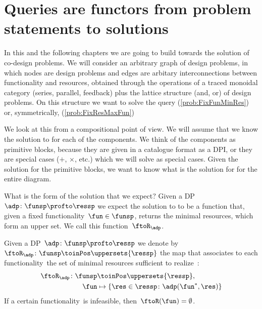 \section{Queries are functors from problem statements to solutions}

\publictodomessage

In this and the following chapters we are going to build towards the solution of co-design problems.
We will consider an arbitrary graph of design problems, in which nodes are design problems and edges are arbitary interconnections between functionality and resources, obtained through the operations of a traced monoidal category (series, parallel, feedback) plus the lattice structure (and, or) of design problems. On this structure we want to solve the query \FixFunMinRes (\cref{prob:FixFunMinRes}) or, symmetrically, \FixResMaxFun (\cref{prob:FixResMaxFun})


We look at this from a compositional point of view.
We will assume that we know the solution to \FixFunMinRes for each of the components.
We think of the components as primitive blocks, because they are given in a catalogue format as a DPI, or they are special cases ($+$, $\times$, etc.) which we will solve as special cases.
Given the solution for the primitive blocks, we want to know what is the solution for \FixFunMinRes for the entire diagram.

What is the form of the solution that we expect?
Given a DP~$\adp\colon \funsp \profto \ressp$ we expect the solution to \FixFunMinRes to be a function that, given a fixed functionality~$\fun\in\funsp$, returns the minimal resources, which form an upper set.
We call this function~$\ftoR_\adp$.

\begin{definition}
    \label{def:ftoR-dp}
    Given a DP~$\adp\colon\funsp\profto\ressp$
    we denote by~$\ftoR_{\adp}\colon \funsp\toinPos \uppersets{\ressp}$ the map that associates
    to each functionality~\fun the set of minimal resources sufficient to realize~\fun:
    \begin{equation*}
        \begin{aligned}
        \ftoR_{\adp}\colon \funsp &\toinPos \uppersets{\ressp},\\
        \fun &\mapsto \{ \res \in \ressp \colon \adp(\fun^*, \res)\}
        \end{aligned}
    \end{equation*}
    If a certain functionality~\fun is infeasible, then~$\ftoR(\fun)=\emptyset$.
\end{definition}

